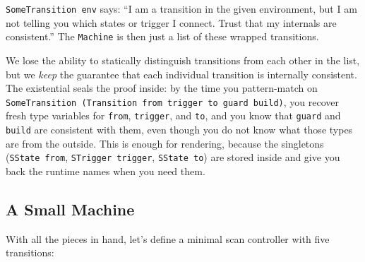 \documentclass[]{article}
\newenvironment{Shaded}{}{}
\newcommand{\CommentTok}[1]{\textcolor[rgb]{0.38,0.63,0.69}{\textit{#1}}}
\newcommand{\DataTypeTok}[1]{\textcolor[rgb]{0.56,0.13,0.00}{#1}}
\newcommand{\NormalTok}[1]{#1}
\newcommand{\OperatorTok}[1]{\textcolor[rgb]{0.40,0.40,0.40}{#1}}
\newcommand{\OtherTok}[1]{\textcolor[rgb]{0.00,0.44,0.13}{#1}}
\begin{document}
\texttt{SomeTransition\ env} says: ``I am a transition in the given environment,
but I am not telling you which states or trigger I connect. Trust that my
internals are consistent.'' The \texttt{Machine} is then just a list of these
wrapped transitions.

We lose the ability to statically distinguish transitions from each other in the
list, but we \emph{keep} the guarantee that each individual transition is
internally consistent. The existential seals the proof inside: by the time you
pattern-match on
\texttt{SomeTransition\ (Transition\ from\ trigger\ to\ guard\ build)}, you
recover fresh type variables for \texttt{from}, \texttt{trigger}, and
\texttt{to}, and you know that \texttt{guard} and \texttt{build} are consistent
with them, even though you do not know what those types are from the outside.
This is enough for rendering, because the singletons (\texttt{SState\ from},
\texttt{STrigger\ trigger}, \texttt{SState\ to}) are stored inside and give you
back the runtime names when you need them.

\subsection{A Small Machine}\label{a-small-machine}

With all the pieces in hand, let's define a minimal scan controller with five
transitions:

\begin{Shaded}
\end{Shaded}
\end{document}
